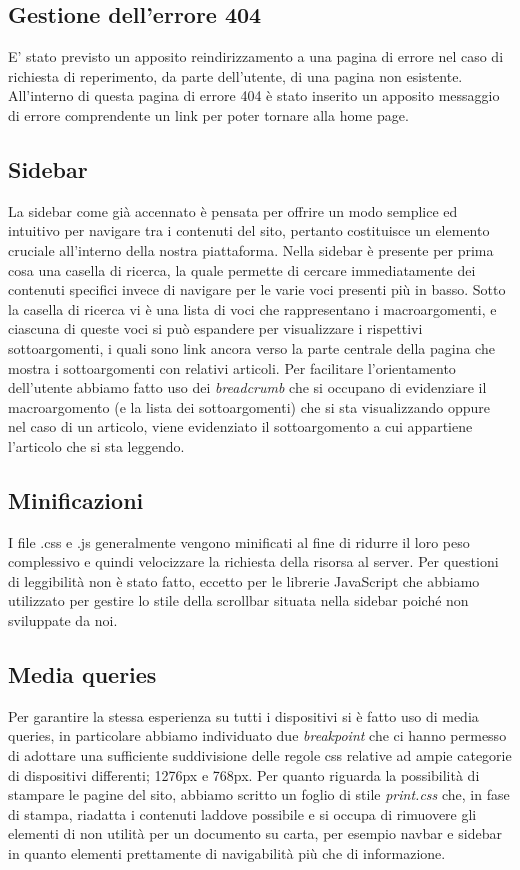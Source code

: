 \documentclass[12pt]{article}
\begin{document}
	\subsection{Gestione dell'errore 404}
	E' stato previsto un apposito reindirizzamento a una pagina di errore nel caso di richiesta di reperimento, da parte dell'utente, di una pagina non esistente.
	All'interno di questa pagina di errore 404 è stato inserito un apposito messaggio di errore comprendente un link per poter tornare alla home page.

	\subsection{Sidebar}
	La sidebar come già accennato è pensata per offrire un modo semplice ed intuitivo per navigare tra i contenuti del sito, pertanto costituisce un elemento cruciale all'interno della nostra piattaforma. Nella sidebar è presente per prima cosa una casella di ricerca, la quale permette di cercare immediatamente dei contenuti specifici invece di navigare per le varie voci presenti più in basso. Sotto la casella di ricerca vi è una lista di voci che rappresentano i macroargomenti, e ciascuna di queste voci si può espandere per visualizzare i rispettivi sottoargomenti, i quali sono link ancora verso la parte centrale della pagina che mostra i sottoargomenti con relativi articoli. Per facilitare l'orientamento dell'utente abbiamo fatto uso dei \emph{breadcrumb} che si occupano di evidenziare il macroargomento (e la lista dei sottoargomenti) che si sta visualizzando oppure nel caso di un articolo, viene evidenziato il sottoargomento a cui appartiene l'articolo che si sta leggendo.
		
	\subsection{Minificazioni}
	I file .css e .js generalmente vengono minificati al fine di ridurre il loro peso complessivo e quindi velocizzare la richiesta della risorsa al server. Per questioni di leggibilità non è stato fatto, eccetto per le librerie JavaScript che abbiamo utilizzato per gestire lo stile della scrollbar situata nella sidebar poiché non sviluppate da noi.
	
	\subsection{Media queries}
	Per garantire la stessa esperienza su tutti i dispositivi si è fatto uso di media queries, in particolare abbiamo individuato due \emph{breakpoint} che ci hanno permesso di adottare una sufficiente suddivisione delle regole css relative ad ampie categorie di dispositivi differenti; 1276px e 768px.
	Per quanto riguarda la possibilità di stampare le pagine del sito, abbiamo scritto un foglio di stile \emph{print.css} che, in fase di stampa, riadatta i contenuti laddove possibile e si occupa di rimuovere gli elementi di non utilità per un documento su carta, per esempio navbar e sidebar in quanto elementi prettamente di navigabilità più che di informazione.
\end{document}
